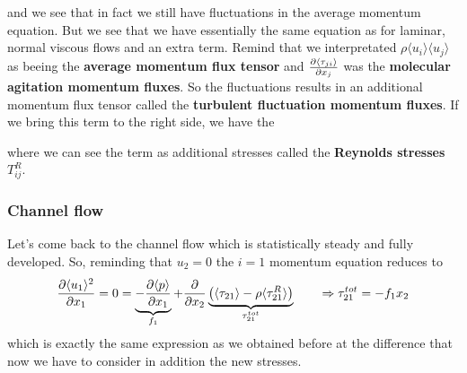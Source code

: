 		and we see that in fact we still have fluctuations in the average momentum equation. But we see that we have essentially the same equation as for laminar, normal viscous flows and an extra term. Remind that we interpretated $\rho \langle u_i \rangle \langle u_j \rangle$ as beeing the \textbf{average momentum flux tensor} and $\frac{\partial \langle \tau _{ji} \rangle}{\partial x_j}$ was the \textbf{molecular agitation momentum fluxes}. So the fluctuations results in an additional momentum flux tensor called the \textbf{turbulent fluctuation momentum fluxes}. If we bring this term to the right side, we have the
		
		\begin{center}
		\end{center}
		where we can see the term as additional stresses called the \textbf{Reynolds stresses} $T_{ij}^R$.
		
		\subsubsection{Channel flow}
			Let's come back to the channel flow which is statistically steady and fully developed. So, reminding that $u_2 = 0$ the $i=1$ momentum equation reduces to
			\begin{equation}
				\frac{\partial \langle u_1 \rangle ^2}{\partial x_1} = 0 = \underbrace{-\frac{\partial \langle p \rangle}{\partial x_1}}_{f_1} + \frac{\partial}{\partial x_2}\underbrace{\left( \langle \tau _{21}\rangle - \rho \langle \tau ^R_{21} \rangle\right)}_{\tau _{21}^{tot}} \qquad \Rightarrow \tau _{21}^{tot} = -f_1 x_2
			\end{equation}			 
			which is exactly the same expression as we obtained before at the difference that now we have to consider in addition the new stresses. 
			
	
